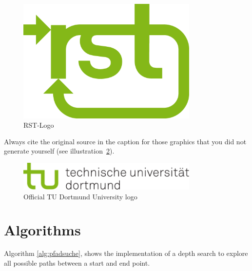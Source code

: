 \begin{figure}[htbp]
	\centering
	\includegraphics[width=9cm]{images/logos/rst_logo_rgb}
	\caption{RST-Logo}
	\label{fig:rst_logo}
\end{figure}

Always cite the original source in the caption for those graphics that you did not generate yourself (see illustration~\ref{fig:tud_logo}).

\begin{figure}[htbp]
	\centering
	\includegraphics[width=9cm]{images/logos/tud_logo_rgb}
	\caption{Official TU Dortmund University logo \parencite{TuDo2}}
	\label{fig:tud_logo}
\end{figure}


\section{Algorithms}
\label{hinweise:algorithmen}

Algorithm \ref{alg:pfadsuche},  shows the implementation of a depth search to explore all possible paths between a start and end point.


